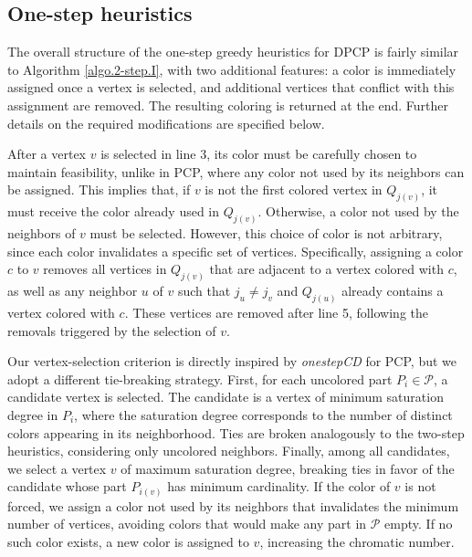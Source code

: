 \documentclass[preprint, 11pt, authoryear]{elsarticle}
\newcommand{\PP}{{\mathcal P}}
\begin{document}
\subsection{One-step heuristics}\label{sec:heuristics:1:step}

The overall structure of the one-step greedy heuristics for DPCP is fairly similar to Algorithm \ref{algo.2-step.I}, with two additional features:
a color is immediately assigned once a vertex is selected, and additional vertices that conflict with this assignment are removed. 
The resulting coloring is returned at the end.
Further details on the required modifications are specified below.

After a vertex $v$ is selected in line 3, its color must be carefully chosen to maintain feasibility, unlike in PCP, where any color not used by its neighbors can be assigned.
This implies that, if $v$ is not the first colored vertex in $Q_{j(v)}$, it must receive the color already used in $Q_{j(v)}$.
Otherwise, a color not used by the neighbors of $v$ must be selected.
However, this choice of color is not arbitrary, since each color invalidates a specific set of vertices.
Specifically, assigning a color $c$ to $v$ removes all vertices in $Q_{j(v)}$ that are adjacent to a vertex colored with $c$, as well as any neighbor $u$ of $v$ such that $j_u \neq j_v$ and $Q_{j(u)}$ already contains a vertex colored with $c$.
These vertices are removed after line 5, following the removals triggered by the selection of $v$.

Our vertex-selection criterion is directly inspired by \emph{onestepCD} for PCP, but we adopt a different tie-breaking strategy.
First, for each uncolored part $P_i \in \PP$, a candidate vertex is selected. The candidate is a vertex of minimum saturation degree in $P_i$, where the saturation degree corresponds to the number of distinct colors appearing in its neighborhood. 
Ties are broken analogously to the two-step heuristics, considering only uncolored neighbors. 
Finally, among all candidates, we select a vertex $v$ of maximum saturation degree, breaking ties in favor of the candidate whose part $P_{i(v)}$ has minimum cardinality.
If the color of $v$ is not forced, we assign a color not used by its neighbors that invalidates the minimum number of vertices, avoiding colors that would make any part in $\PP$ empty.
If no such color exists, a new color is assigned to $v$, increasing the chromatic number.

\end{document}
